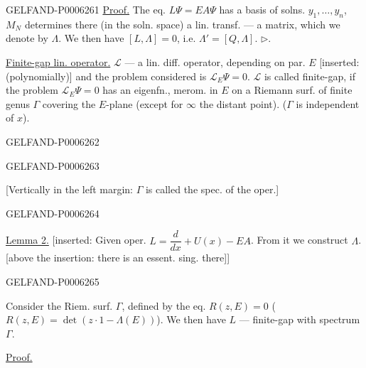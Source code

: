 \begin{GelfandAdjacentEvidence}{GELFAND-P000626}{1}
\underline{Proof.} The eq. \(L\Psi=EA\Psi\) has a basis of solns.
\(y_1,\ldots,y_n\), \(M_N\) determines there
(in the soln. space) a lin. transf. --- a matrix,
which we denote by \(\Lambda\). We then have \([L,\Lambda]=0\),
i.e. \(\Lambda'=[Q,\Lambda]\). \(\triangleright\).

\underline{Finite-gap lin. operator.} \(\mathcal L\) --- a lin. diff. operator,
depending on par. \(E\) [inserted: (polynomially)] and the problem considered is
\(\mathcal L_E\Psi=0\).
\(\mathcal L\) is called finite-gap, if the problem \(\mathcal L_E\Psi=0\)
has an eigenfn., merom. in \(E\) on a Riemann surf. of finite genus \(\Gamma\)
covering the \(E\)-plane (except for \(\infty\) the distant point).
(\(\Gamma\) is independent of \(x\)).
\end{GelfandAdjacentEvidence}
\begin{GelfandAdjacentEvidence}{GELFAND-P000626}{2}

\end{GelfandAdjacentEvidence}
\begin{GelfandAdjacentEvidence}{GELFAND-P000626}{3}

[Vertically in the left margin: \(\Gamma\) is called the spec. of the oper.]
\end{GelfandAdjacentEvidence}
\begin{GelfandAdjacentEvidence}{GELFAND-P000626}{4}


\underline{Lemma 2.}
[inserted: Given oper. \(L=\dfrac{d}{dx}+U(x)-EA\).
From it we construct \(\Lambda\). [above the insertion: there is an essent. sing. there]]
\end{GelfandAdjacentEvidence}
\begin{GelfandAdjacentEvidence}{GELFAND-P000626}{5}

Consider the Riem. surf. \(\Gamma\), defined by the eq. \(R(z,E)=0\)
(\(R(z,E)=\det(z\cdot1-\Lambda(E))\)).
We then have \(L\) --- finite-gap with spectrum \(\Gamma\).

\underline{Proof.}
\end{GelfandAdjacentEvidence}
